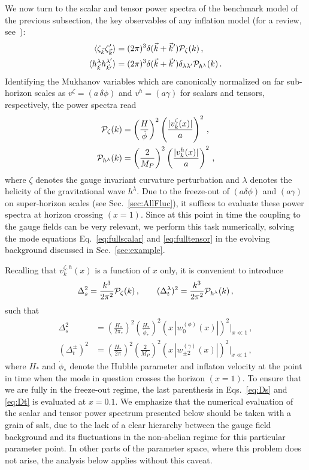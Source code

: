 We now turn to the scalar and tensor power spectra of the benchmark model of the previous subsection, the key observables of any inflation model (for a review, see~\cite{Baumann:2009ds}):
\begin{align}
 \langle \zeta_{\vec k} \zeta_{\vec k}' \rangle & = (2 \pi)^3 \delta (\vec k + \vec k') {\cal P}_\zeta(k)  \,, \\
 \langle h_{\vec k}^\lambda h_{\vec k'}^{\lambda'} \rangle & = (2 \pi)^3 \delta (\vec k + \vec k') \delta_{\lambda \lambda'} {\cal P}_{h^\lambda}(k)  \,.
\end{align}
Identifying the Mukhanov variables which are canonically normalized on far sub-horizon scales as $v^\zeta = (a \, \delta \phi)$ and $v^h = (a \gamma)$ for scalars and tensors, respectively, the power spectra read
\begin{align}
  {\cal P}_\zeta(k) & =  \left( \frac{H}{\dot \phi} \right)^2 \left(\frac{|v^\zeta_k(x)|}{a}\right)^2 \,, \\
  {\cal P}_{h^\lambda}(k) & =  \left( \frac{2}{M_P} \right)^2 \left(\frac{|v^h_k(x)|}{a}\right)^2 \,,
\end{align}
where $\zeta$ denotes the gauge invariant curvature perturbation and $\lambda$ denotes the helicity of the gravitational wave $h^\lambda$.
Due to the freeze-out of $(a \delta \phi)$ and $(a \gamma)$ on super-horizon scales (see Sec.~\ref{sec:AllFluc}), it suffices to evaluate these power spectra at horizon crossing $(x = 1)$. Since at this point in time the coupling to the gauge fields can be very relevant, we perform this task numerically, solving the mode equations Eq.~\eqref{eq:fullscalar} and \eqref{eq:fulltensor} in the evolving background discussed in Sec.~\ref{sec:example}.

Recalling that $ v_k^{\zeta,h}(x)$ is a function of $x$ only, it is convenient to introduce
\begin{equation}
 \Delta_s^2 = \frac{k^3}{2 \pi^2} {\cal P}_\zeta(k) \,, \qquad  (\Delta_t^\lambda)^2 = \frac{k^3}{2 \pi^2} {\cal P}_{h^\lambda}(k) \,,
\end{equation}
such that
\begin{align}
 \Delta_s^2 & = \left( \frac{H_*}{2 \pi_*}\right)^2 \left( \frac{H_*}{\dot \phi_*}\right)^2  \left(  x \, |w^{(\phi)}_0(x)| \right)^2 \bigg|_{x \ll 1}  \,, \label{eq:Ds}\\
 (\Delta_t^\pm)^2 & = \left( \frac{H_*}{2 \pi}\right)^2 \left( \frac{2}{M_P}\right)^2  \left(  x \, |w^{(\gamma)}_{\pm2}(x)| \right)^2 \bigg|_{x \ll 1}  \,, \label{eq:Dt}
\end{align}
where $H_*$ and $\dot \phi_*$ denote the Hubble parameter and inflaton velocity at the point in time when the mode in question crosses the horizon $(x = 1)$. To ensure that we are fully in the freeze-out regime, the last parenthesis in Eqs.~\eqref{eq:Ds} and \eqref{eq:Dt} is evaluated at $x = 0.1$. We emphasize that the numerical evaluation of the scalar and tensor power spectrum presented below should be taken with a grain of salt, due to the lack of a clear hierarchy between the gauge field background and its fluctuations in the non-abelian regime for this particular parameter point. In other parts of the parameter space, where this problem does not arise, the analysis below applies without this caveat.  


